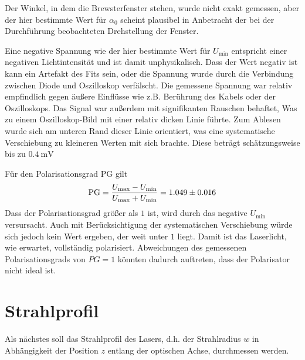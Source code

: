 \documentclass{article}
\newcommand{\mr}{\mathrm}
\begin{document}
Der Winkel, in dem die Brewsterfenster stehen, wurde nicht exakt gemessen,
aber der hier bestimmte Wert für $\alpha_0$ scheint plausibel in Anbetracht der
bei der Durchführung beobachteten Drehstellung der Fenster.

Eine negative Spannung wie der hier bestimmte Wert für $U_\mr{min}$ entspricht einer negativen
Lichtintensität und ist damit unphysikalisch. Dass der Wert negativ ist kann ein Artefakt des Fits sein,
oder die Spannung wurde durch die Verbindung zwischen Diode und Oszilloskop verfälscht. Die gemessene
Spannung war relativ empfindlich gegen äußere Einflüsse wie z.B. Berührung des Kabels oder der Oszilloskops.
Das Signal war außerdem mit signifikanten Rauschen behaftet, Was zu einem Oszilloskop-Bild mit einer relativ
dicken Linie führte. Zum Ablesen wurde sich am unteren Rand dieser Linie orientiert,
was eine systematische Verschiebung zu kleineren Werten mit sich brachte. Diese beträgt schätzungsweise bis zu $\SI{0.4}{\mV}$


Für den Polarisationsgrad PG gilt 
\begin{equation}
  \mr{PG} = \frac{U_\mr{max} - U_\mr{min}}{U_\mr{max} + U_\mr{min}} = \num{1.049\pm0.016}
\end{equation}
Dass der Polarisationsgrad größer als $1$ ist, wird durch das negative $U_\mr{min}$ versursacht.
Auch mit Berücksichtigung der systematischen Verschiebung würde sich jedoch kein Wert ergeben,
der weit unter $1$ liegt. Damit ist das Laserlicht, wie erwartet, vollständig polarisiert.
Abweichungen des gemessenen Polarisationsgrads von $PG=1$ könnten dadurch auftreten, dass der Polarisator nicht ideal ist.


\section{Strahlprofil}
Als nächstes soll das Strahlprofil des Lasers, d.h. der Strahlradius $w$ in Abhängigkeit der Position $z$ 
entlang der optischen Achse, durchmessen werden.
\end{document}
